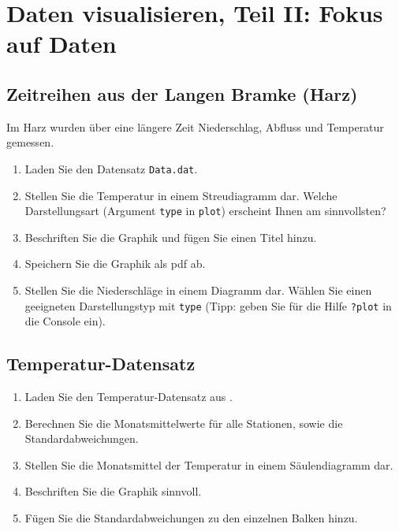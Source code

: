 \documentclass[]{book}
\providecommand{\tightlist}{%
  \setlength{\itemsep}{0pt}\setlength{\parskip}{0pt}}
\begin{document}
\hypertarget{daten-visualisieren-teil-ii-fokus-auf-daten}{%
\section{Daten visualisieren, Teil II: Fokus auf Daten}\label{daten-visualisieren-teil-ii-fokus-auf-daten}}

\hypertarget{zeitreihen-aus-der-langen-bramke-harz}{%
\subsection{Zeitreihen aus der Langen Bramke (Harz)}\label{zeitreihen-aus-der-langen-bramke-harz}}

Im Harz wurden über eine längere Zeit Niederschlag, Abfluss und Temperatur gemessen.

\begin{enumerate}
\def\labelenumi{\arabic{enumi}.}
\tightlist
\item
  Laden Sie den Datensatz \texttt{Data.dat}.
\item
  Stellen Sie die Temperatur in einem Streudiagramm dar. Welche Darstellungsart (Argument \texttt{type} in \texttt{plot}) erscheint Ihnen am sinnvollsten?
\item
  Beschriften Sie die Graphik und fügen Sie einen Titel hinzu.
\item
  Speichern Sie die Graphik als pdf ab.
\item
  Stellen Sie die Niederschläge in einem Diagramm dar. Wählen Sie einen geeigneten Darstellungstyp mit \texttt{type} (Tipp: geben Sie für die Hilfe \texttt{?plot} in die Console ein).
\end{enumerate}

\hypertarget{temperatur-datensatz}{%
\subsection{Temperatur-Datensatz}\label{temperatur-datensatz}}

\begin{enumerate}
\def\labelenumi{\arabic{enumi}.}
\tightlist
\item
  Laden Sie den Temperatur-Datensatz aus \citet{Zuur2009a}.
\item
  Berechnen Sie die Monatsmittelwerte für alle Stationen, sowie die Standardabweichungen.
\item
  Stellen Sie die Monatsmittel der Temperatur in einem Säulendiagramm dar.
\item
  Beschriften Sie die Graphik sinnvoll.
\item
  Fügen Sie die Standardabweichungen zu den einzelnen Balken hinzu.
\end{enumerate}
\end{document}
